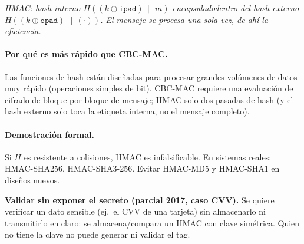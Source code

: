 \documentclass[11pt,a4paper]{article}
\newcommand{\diagcaption}[1]{\begin{center}\small\textit{#1}\end{center}}
\begin{document}
\begin{center}
\end{center}
\diagcaption{HMAC: hash interno $H((k\oplus\texttt{ipad})\,\|\,m)$ encapsuladodentro
del hash externo $H((k\oplus\texttt{opad})\,\|\,(\cdot))$.  El mensaje se procesa
una sola vez, de ah\'i la eficiencia.}

\paragraph{Por qu\'e es m\'as r\'apido que CBC-MAC.}
Las funciones de hash est\'an dise\~nadas para procesar grandes vol\'umenes de datos
muy r\'apido (operaciones simples de bit).  CBC-MAC requiere una evaluaci\'on de
cifrado de bloque por bloque de mensaje; HMAC solo dos pasadas de hash (y el hash
externo solo toca la etiqueta interna, no el mensaje completo).

\paragraph{Demostraci\'on formal.}  Si $H$ es resistente a colisiones, HMAC es
infalsificable.  En sistemas reales: HMAC-SHA256, HMAC-SHA3-256.  Evitar HMAC-MD5
y HMAC-SHA1 en dise\~nos nuevos.

\begin{examen}
\textbf{Validar sin exponer el secreto (parcial 2017, caso CVV).}
Se quiere verificar un dato sensible (ej.\ el CVV de una tarjeta) sin almacenarlo
ni transmitirlo en claro: se almacena/compara un HMAC con clave sim\'etrica.
Quien no tiene la clave no puede generar ni validar el tag.
\end{examen}
\end{document}
